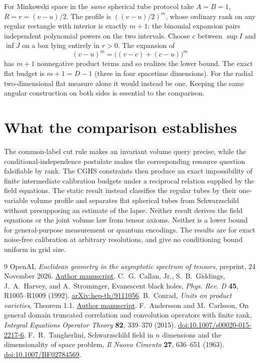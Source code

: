 \documentclass[11pt,letterpaper]{article}
\begin{document}
For Minkowski space in the \emph{same} spherical tube protocol take $A=B=1$, $R=r=(v-u)/2$. The profile is $((v-u)/2)^m$, whose ordinary rank on any regular rectangle with interior is exactly $m+1$: the binomial expansion pairs independent polynomial powers on the two intervals. Choose $c$ between $\sup I$ and $\inf J$ on a box lying entirely in $r>0$. The expansion of
\[
 (v-u)^m=\big((v-c)+(c-u)\big)^m
\]
has $m+1$ nonnegative product terms and so realizes the lower bound. The exact flat budget is $m+1=D-1$ (three in four spacetime dimensions). For the radial two-dimensional flat measure alone it would instead be one. Keeping the same angular construction on both sides is essential to the comparison.

\section{What the comparison establishes}

The common-label cut rule makes an invariant volume query precise, while the conditional-independence postulate makes the corresponding resource question falsifiable by rank. The CGHS constraints then produce an exact impossibility of finite intermediate calibration budgets under a reciprocal relation supplied by the field equations. The static result instead classifies the regular tubes by their one-variable volume profile and separates flat spherical tubes from Schwarzschild without presupposing an estimate of the lapse. Neither result derives the field equations or the joint volume law from tensor axioms. Neither is a lower bound for general-purpose measurement or quantum encodings. The results are for exact noise-free calibration at arbitrary resolutions, and give no conditioning bound uniform in grid size.

\begin{thebibliography}{9}
 OpenAI, \emph{Euclidean geometry in the asymptotic spectrum of tensors}, preprint, 24 November 2026. \href{https://github.com/openai/math/blob/main/preprints/Euclidean-geometry-in-the-asymptotic-spectrum-of-tensors-November-24-2026/paper.pdf}{Author manuscript}.
 C.~G.~Callan, Jr., S.~B.~Giddings, J.~A.~Harvey, and A.~Strominger, Evanescent black holes, \emph{Phys. Rev. D} \textbf{45}, R1005--R1009 (1992). \href{https://arxiv.org/abs/hep-th/9111056}{arXiv:hep-th/9111056}.
 B.~Conrad, \emph{Units on product varieties}, Theorem 1.1. \href{https://math.stanford.edu/~conrad/papers/unitthm.pdf}{Author manuscript}.
 F.~Andersson and M.~Carlsson, On general domain truncated correlation and convolution operators with finite rank, \emph{Integral Equations Operator Theory} \textbf{82}, 339--370 (2015). \href{https://doi.org/10.1007/s00020-015-2217-6}{doi:10.1007/s00020-015-2217-6}.
 F.~R.~Tangherlini, Schwarzschild field in $n$ dimensions and the dimensionality of space problem, \emph{Il Nuovo Cimento} \textbf{27}, 636--651 (1963). \href{https://doi.org/10.1007/BF02784569}{doi:10.1007/BF02784569}.
\end{thebibliography}
\end{document}
